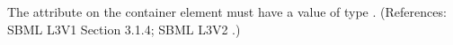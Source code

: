 The attribute  on the  container element
must have a value of type .  (References: SBML L3V1 Section 3.1.4; SBML
L3V2 .)
